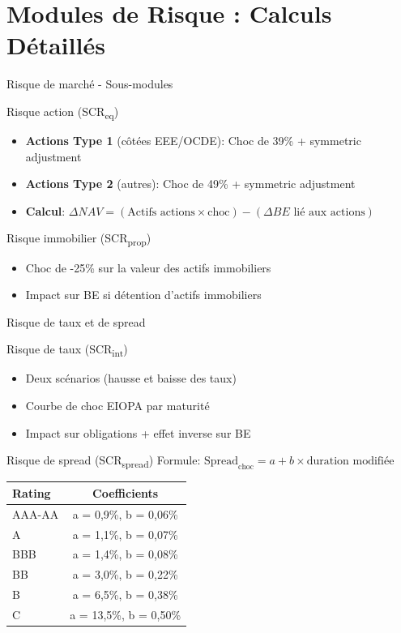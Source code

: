 \documentclass[10pt,aspectratio=169]{beamer}
\begin{document}
\section{Modules de Risque : Calculs Détaillés}
\begin{frame}{Risque de marché - Sous-modules}
\begin{block}{Risque action (SCR\textsubscript{eq})}
\begin{itemize}
\item \textbf{Actions Type 1} (côtées EEE/OCDE): Choc de 39\% + symmetric adjustment
\item \textbf{Actions Type 2} (autres): Choc de 49\% + symmetric adjustment
\item \textbf{Calcul}: $\Delta NAV = (\text{Actifs actions} \times \text{choc}) - (\Delta BE \text{ lié aux actions})$
\end{itemize}
\end{block}

\begin{block}{Risque immobilier (SCR\textsubscript{prop})}
\begin{itemize}
\item Choc de -25\% sur la valeur des actifs immobiliers
\item Impact sur BE si détention d'actifs immobiliers
\end{itemize}
\end{block}
\end{frame}

\begin{frame}{Risque de taux et de spread}
\begin{block}{Risque de taux (SCR\textsubscript{int})}
\begin{itemize}
\item Deux scénarios (hausse et baisse des taux)
\item Courbe de choc EIOPA par maturité
\item Impact sur obligations + effet inverse sur BE
\end{itemize}
\end{block}

\begin{block}{Risque de spread (SCR\textsubscript{spread})}
Formule: $\text{Spread}_{\text{choc}} = a + b \times \text{duration modifiée}$

\begin{table}
\scriptsize
\begin{tabular}{lc}
\textbf{Rating} & \textbf{Coefficients} \\
\midrule
AAA-AA & a = 0,9\%, b = 0,06\% \\
A & a = 1,1\%, b = 0,07\% \\
BBB & a = 1,4\%, b = 0,08\% \\
BB & a = 3,0\%, b = 0,22\% \\
B & a = 6,5\%, b = 0,38\% \\
C & a = 13,5\%, b = 0,50\% \\
\end{tabular}
\end{table}
\end{block}
\end{frame}
\end{document}
